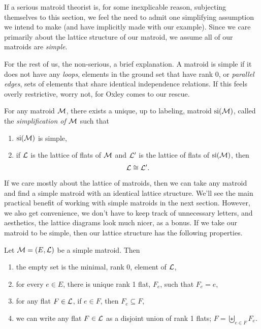 \documentclass[12pt,oneside]{../../sfsuthesis}
\begin{document}
If a serious matroid theorist is, for some inexplicable reason, subjecting themselves to this section, we feel the need to admit one simplifying assumption we intend to make (and have implicitly made with our example).
Since we care primarily about the lattice structure of our matroid, we assume all of our matroids are \emph{simple}.

For the rest of us, the non-serious, a brief explanation.
A matroid is simple if it does not have any \emph{loops}, elements in the ground set that have rank 0, or \emph{parallel edges}, sets of elements that share identical independence relations.
If this feels overly restrictive, worry not, for Oxley\cite[p.~49]{oxleyMatroidTheory2011} comes to our rescue.
\begin{proposition}\th\label{thm:simplificationLattice}
    For any matroid \( \mathcal{M} \), there exists a unique, up to labeling, matroid \( \operatorname{si}(\mathcal{M}) \), called the \emph{simplification of \( \mathcal{M} \)}
    such that
    \begin{enumerate}[label=\roman*.]
        \item \( \operatorname{si}(\mathcal{M}) \) is simple,
        \item if \( \mathcal{L} \) is the lattice of flats of \( \mathcal{M} \) and \( \mathcal{L}' \) is the lattice of flats of \( \operatorname{si}(\mathcal{M}) \), then
              \[
                  \mathcal{L} \cong \mathcal{L}'.
              \]
    \end{enumerate}
\end{proposition}

If we care mostly about the lattice of matroids, then we can take any matroid and find a simple matroid with an identical lattice structure.
We'll see the main practical benefit of working with simple matroids in the next section.
However, we also get convenience, we don't have to keep track of unnecessary letters, and aesthetics, the lattice diagrams look much nicer, as a bonus.
If we take our matroid to be simple, then our lattice structure has the following properties.

\begin{proposition}\th\label{thm:simpMatroidProps}
    Let \( \mathcal{M} = (E, \mathcal{L}) \) be a simple matroid.
    Then
    \begin{enumerate}[label=\roman*.]
        \item the empty set is the minimal, rank 0, element of \( \mathcal{L} \),
        \item for every \( e \in E \), there is unique rank 1 flat, \( F_e \), such that \( F_e = e \),
        \item for any flat \( F \in \mathcal{L} \), if \( e \in F \), then \( F_e \subseteq F \),
        \item we can write any flat \( F \in \mathcal{L} \) as a disjoint union of rank 1 flats; \( F = \biguplus_{e \in F}F_e \).
    \end{enumerate}
\end{proposition}
\end{document}
